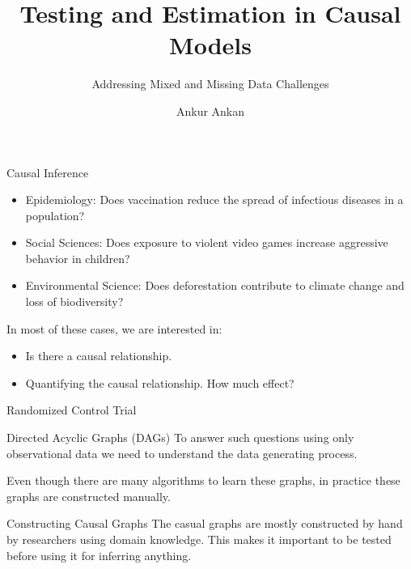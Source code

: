 \documentclass[aspectratio=169]{beamer}
\begin{document}
\title{Testing and Estimation in Causal Models}
\subtitle{Addressing Mixed and Missing Data Challenges}
\author{Ankur Ankan}
\date{}

\maketitle

\begin{frame}{Causal Inference}

	\begin{itemize}
		\item Epidemiology: Does vaccination reduce the spread of infectious diseases in a population?
		\item Social Sciences: Does exposure to violent video games increase aggressive behavior in children?
		\item Environmental Science: Does deforestation contribute to climate change and loss of biodiversity?
	\end{itemize}

	In most of these cases, we are interested in:
	\begin{itemize}
		\item Is there a causal relationship.
		\item Quantifying the causal relationship. How much effect?
	\end{itemize}
\end{frame}

\begin{frame}{Randomized Control Trial}

\end{frame}

\begin{frame}{Directed Acyclic Graphs (DAGs)}
	To answer such questions using only observational data we need to understand the data generating process.


	Even though there are many algorithms to learn these graphs, in practice these graphs are constructed manually.
\end{frame}

\begin{frame}{Constructing Causal Graphs}
	The casual graphs are mostly constructed by hand by researchers using domain knowledge.
	This makes it important to be tested before using it for inferring anything.
\end{frame}
\end{document}
